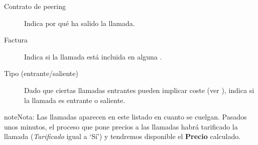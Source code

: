 \documentclass[letterpaper,10pt,spanish]{sphinxmanual}
\begin{document}
\begin{description}
\item[{Contrato de peering}] \leavevmode{}\label{billing_and_invoices/billable_calls:term-peering-contract}
Indica por qué {\hyperref[external_incoming_calls/peering_contracts:peering\string-contracts]{}} ha salido la llamada.

\item[{Factura}] \leavevmode{}\label{billing_and_invoices/billable_calls:term-invoice}
Indica si la llamada está incluida en alguna {\hyperref[billing_and_invoices/invoices:invoices]{}}.

\item[{Tipo (entrante/saliente)}] \leavevmode{}\label{billing_and_invoices/billable_calls:term-type-inbound-outbound}
Dado que ciertas llamadas entrantes pueden implicar coste (ver {\hyperref[external_incoming_calls/configure_ddi:bill\string-inbound]{}}), indica si la llamada es entrante o saliente.

\end{description}

\begin{notice}{note}{Nota:}
Las llamadas aparecen en este listado en cuanto se cuelgan. Pasados unos minutos, el proceso que pone precios a las llamadas habrá tarificado la llamada (\emph{Tarificado} igual a `Sí') y tendremos disponible el \textbf{Precio} calculado.
\end{notice}
\end{document}
